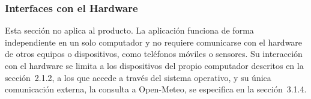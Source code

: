 \subsubsection{Interfaces con el Hardware}
Esta sección no aplica al producto. La aplicación funciona de forma independiente en un solo computador y no requiere comunicarse con el hardware de otros equipos o dispositivos, como teléfonos móviles o sensores. Su interacción con el hardware se limita a los dispositivos del propio computador descritos en la sección~2.1.2, a los que accede a través del sistema operativo, y su única comunicación externa, la consulta a Open-Meteo, se especifica en la sección~3.1.4.